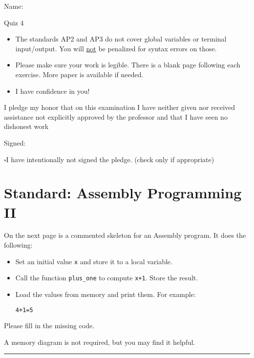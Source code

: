 \documentclass[12pt]{article}
\begin{document}
Name: \makebox[3in]{\hrulefill}

\vfill

\begin{center}
{\huge Quiz 4}
\end{center}

\begin{itemize}
    \item The standards AP2 and AP3 do not cover global variables or terminal input/output. You will \underline{not} be penalized for syntax errors on those.
    \item Please make sure your work is legible. There is a blank page following each exercise. More paper is available if needed.
    \item I have confidence in you!
\end{itemize}

\vfill

I pledge my honor that on this examination I have neither given nor received assistance not explicitly approved by the professor and that I have seen no dishonest work 

\hfill Signed: \makebox[3in]{\hrulefill}

$\square$\quad I have intentionally not signed the pledge. (check only if appropriate)
\newpage

\section*{Standard: Assembly Programming II}

On the next page is a commented skeleton for an Assembly program. It does the following:
\begin{itemize}
    \item Set an initial value \texttt{x} and store it to a local variable.
    \item Call the function \texttt{plus\_one} to compute \texttt{x+1}. Store the result.
    \item Load the values from memory and print them. For example:
    \begin{alltt}
    4 + 1 = 5
    \end{alltt}
\end{itemize}

Please fill in the missing code. 

A memory diagram is not required, but you may find it helpful.

\vfill

\rule[1ex]{\textwidth}{.1pt}
\end{document}
